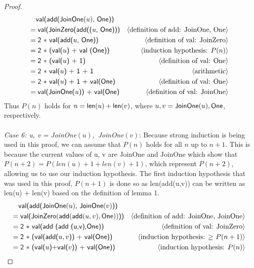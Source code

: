 \documentclass[11pt,fleqn]{article}
\newcommand{\mname}[1]{\mbox{\sf #1}}
\newcommand{\pnote}[1]{{\langle \text{#1} \rangle}}
\begin{document}
\begin{proof}
    \begin{align*}
      &\phantom{{}=} \mname {val(add(JoinOne$(u)$, One))} \\
      &= \mname{val(JoinZero(add(($u$, One)))}  & \pnote{definition of add: JoinOne, One}\\
      &= \mname{2 $*$ val(add($u$, One))}  & \pnote{definition of val: JoinZero}\\
      &= \mname{2 $*$ (val($u$) + val (One))}  & \pnote{induction hypothesis: $P(n)$}\\
      &= \mname{2 $*$ (val($u$) + 1)}  & \pnote{definition of val: One}\\
      &= \mname{2 $*$ val($u$) + 1 + 1}  & \pnote{arithmetic}\\
      &= \mname{2 $*$ val($u$) + 1 + val(One)}  & \pnote{definition of val: One}\\
      &= \mname{val(JoinOne($u$)) + val(One)}  & \pnote{definition of val: JoinOne}\\
    \end{align*}
    Thus $P(n)$ holds for $n = \mname{len}(u) + \mname{len}(v)$, where $u, v = \mname{JoinOne}(u), \mname{ One}$, respectively.
    \\\\
    \emph{Case 6: u, v = \mname{JoinOne$(u)$, JoinOne$(v)$}}:
    Because strong induction is being used in this proof, we can assume that $P(n)$ holds for all $n$ up to $n + 1$. This is because the current values of u, v are JoinOne and JoinOne which show that $P(n+2) = P(len(u) + 1 + len(v) + 1)$, which represent $P(n+2)$, allowing us to use our induction hypothesis. The first induction hypothesis that was used in this proof, $P(n+1)$ is done so as len(add(u,v)) can be written as len(u) + len(v) based on the definition of lemma 1.\\
    \begin{align*}
      &\phantom{{}=} \mname {val(add(JoinOne$(u)$, JoinOne$(v)$))} \\
      &= \mname{val($\mname{JoinZero}(\mname{add} (\mname{add} (u,v),\mname{One}))$))}  & \pnote{definition of add: JoinOne, JoinOne}\\
      &= \mname{2 $*$ val(\mname{add} (\mname{add} (u,v),\mname{One}))}  & \pnote{definition of val: JoinZero}\\
      &= \mname{2 $*$ (val(add($u,v$)) + val(One))}  & \pnote{induction hypothesis: $\ge$ $P(n+1)$}\\
      &= \mname{2 $*$ (val($u$)+val($v$)) + val(One))}  & \pnote{induction hypothesis: $P(n)$}\\

\end{align*}
\end{proof}
\end{document}
